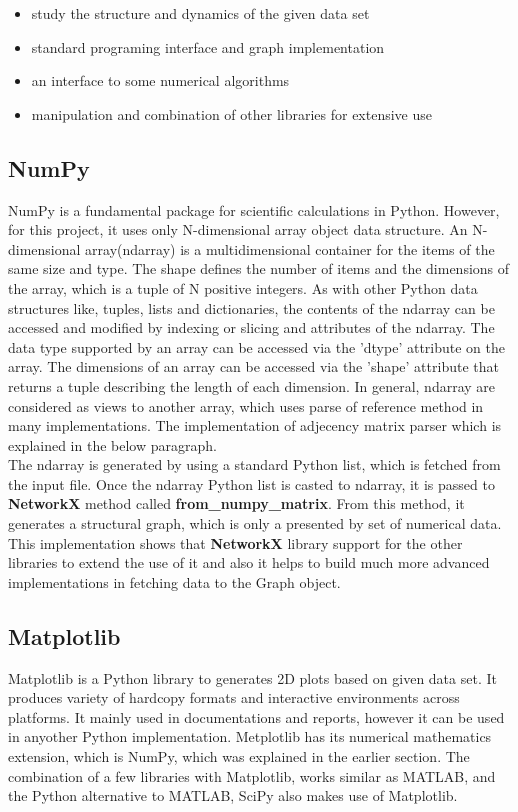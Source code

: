 \documentclass[11pt]{article}
\begin{document}
\begin{itemize}
	\item study the structure and dynamics of the given data set
	\item standard programing interface and graph implementation
	\item an interface to some numerical algorithms
	\item manipulation and combination of other libraries for extensive use
\end{itemize}


\subsection{NumPy}

NumPy is a fundamental package for scientific calculations in Python. However, for this project, it uses only N-dimensional array object data structure. An N-dimensional array\big(ndarray) is a multidimensional container for the items of the same size and type. The shape defines the number of items and the dimensions of the array, which is a tuple of N positive integers. As with other Python data structures like, tuples, lists and dictionaries, the contents of the ndarray can be accessed and modified by indexing or slicing and attributes of the ndarray. The data type supported by an array can be accessed via the 'dtype' attribute on the array. The dimensions of an array can be accessed via the 'shape' attribute that returns a tuple describing the length of each dimension.  In general, ndarray are considered as views to another array, which uses parse of reference method in many implementations. The implementation of adjecency matrix parser which is explained in the below paragraph. \\

\noindent
The ndarray is generated by using a standard Python list, which is fetched from the input file. Once the ndarray Python list is casted to ndarray, it is passed to \textbf{NetworkX} method called \textbf{from\_numpy\_matrix}. From this method, it generates a structural graph, which is only a presented by set of numerical data.\\

\noindent
This implementation shows that \textbf{NetworkX} library support for the other libraries to extend the use of it and also it helps to build much more advanced implementations in fetching data to the Graph object.

\subsection{Matplotlib}
Matplotlib is a Python library to generates 2D plots based on given data set. It produces variety of hardcopy formats and interactive environments across platforms. It mainly used in documentations and reports, however it can be used in anyother Python implementation. Metplotlib has its numerical mathematics extension, which is NumPy, which was explained in the earlier section. The combination of a few libraries with Matplotlib, works similar as MATLAB, and the Python alternative to MATLAB, SciPy also makes use of Matplotlib.
\end{document}
